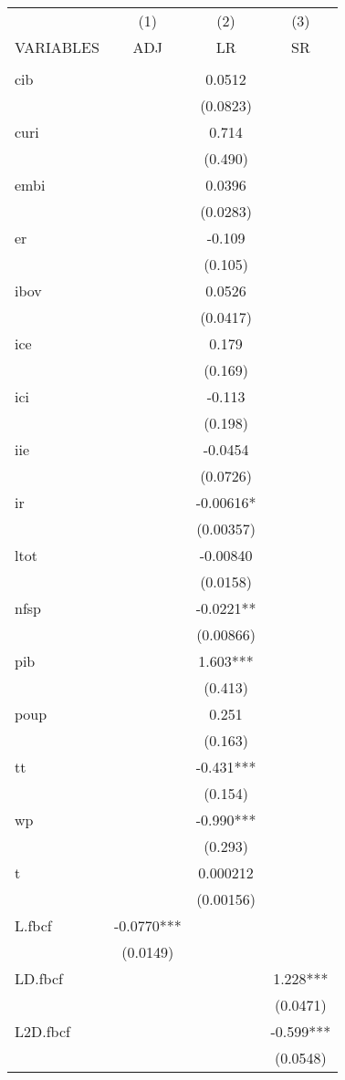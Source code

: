 \begin{tabular}{lccc} \hline
 & (1) & (2) & (3) \\
VARIABLES & ADJ & LR & SR \\ \hline
 &  &  &  \\
cib &  & 0.0512 &  \\
 &  & (0.0823) &  \\
curi &  & 0.714 &  \\
 &  & (0.490) &  \\
embi &  & 0.0396 &  \\
 &  & (0.0283) &  \\
er &  & -0.109 &  \\
 &  & (0.105) &  \\
ibov &  & 0.0526 &  \\
 &  & (0.0417) &  \\
ice &  & 0.179 &  \\
 &  & (0.169) &  \\
ici &  & -0.113 &  \\
 &  & (0.198) &  \\
iie &  & -0.0454 &  \\
 &  & (0.0726) &  \\
ir &  & -0.00616* &  \\
 &  & (0.00357) &  \\
ltot &  & -0.00840 &  \\
 &  & (0.0158) &  \\
nfsp &  & -0.0221** &  \\
 &  & (0.00866) &  \\
pib &  & 1.603*** &  \\
 &  & (0.413) &  \\
poup &  & 0.251 &  \\
 &  & (0.163) &  \\
tt &  & -0.431*** &  \\
 &  & (0.154) &  \\
wp &  & -0.990*** &  \\
 &  & (0.293) &  \\
t &  & 0.000212 &  \\
 &  & (0.00156) &  \\
L.fbcf & -0.0770*** &  &  \\
 & (0.0149) &  &  \\
LD.fbcf &  &  & 1.228*** \\
 &  &  & (0.0471) \\
L2D.fbcf &  &  & -0.599*** \\
 &  &  & (0.0548) \\

\end{tabular}
